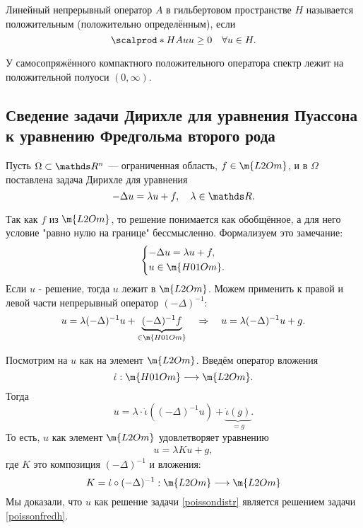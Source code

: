 \begin{definition}
Линейный непрерывный оператор $A$ в гильбертовом пространстве $H$ называется положительным (положительно определённым), если
$$ \scalprod*{H}{Au}{u} \geq 0 \quad \forall u \in H.$$
\end{definition}

\begin{note} У самосопряжённого компактного положительного оператора спектр лежит на положительной полуоси $(0, \infty)$.
\end{note}


\subsection{Сведение задачи Дирихле для уравнения Пуассона к уравнению Фредгольма второго рода}
Пусть $\Omega \subset \real^n$ --- ограниченная область, $f \in \m{L2Om}$, и в $\Omega$ поставлена задача Дирихле для уравнения
$$ - \Delta u = \lambda u + f, \quad \lambda \in \real.$$

Так как $f$ из $\m{L2Om}$, то решение понимается как обобщённое, а для него условие "равно нулю на границе" бессмысленно. Формализуем это замечание:
\begin{align}
	\begin{cases*}
		- \Delta u = \lambda u + f, \\
		u \in \m{H01Om}.
	\end{cases*}
\label{poissondistr}
\end{align} 
Если $u$ - решение, тогда $u$ лежит в  $\m{L2Om}$. Можем применить к правой и левой части непрерывный оператор $(-\Delta)^{-1}$:
$$ u = \lambda (-\Delta)^{-1}u + \underbrace{(-\Delta)^{-1}f}_{\in \m{H01Om}} \quad \Rightarrow \quad u = \lambda (-\Delta)^{-1} u + g.$$

Посмотрим на $u$ как на элемент $\m{L2Om}$. Введём оператор вложения
$$ \dot\iota : \m{H01Om} \longrightarrow \m{L2Om}.$$
Тогда
$$ u = \lambda \cdot \dot\iota ( (- \Delta)^{-1} u) + \underbrace {\dot\iota(g)}_{=g}.$$
То есть, $u$ как элемент $\m{L2Om}$ удовлетворяет уравнению
\begin{align}
	u = \lambda K u + g,
\label{poissonfredh}
\end{align}
где $K$ это композиция $(-\Delta)^{-1}$ и вложения:
$$ K = \dot\iota \circ (-\Delta)^{-1} : \m{L2Om} \longrightarrow \m{L2Om} $$
Мы доказали, что $u$ как решение задачи \eqref{poissondistr} является решением задачи \eqref{poissonfredh}.

